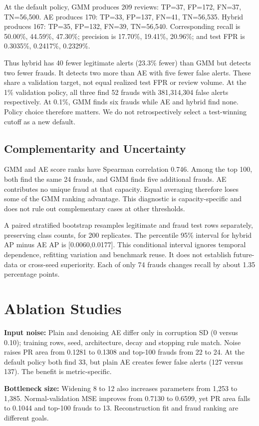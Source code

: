 \documentclass[conference]{IEEEtran}
\begin{document}
At the default policy, GMM produces 209 reviews: TP=37, FP=172, FN=37, TN=56,500. AE produces 170: TP=33, FP=137, FN=41, TN=56,535. Hybrid produces 167: TP=35, FP=132, FN=39, TN=56,540. Corresponding recall is 50.00\%, 44.59\%, 47.30\%; precision is 17.70\%, 19.41\%, 20.96\%; and test FPR is 0.3035\%, 0.2417\%, 0.2329\%.

Thus hybrid has 40 fewer legitimate alerts (23.3\% fewer) than GMM but detects two fewer frauds. It detects two more than AE with five fewer false alerts. These share a validation target, not equal realized test FPR or review volume. At the 1\% validation policy, all three find 52 frauds with 381,314,304 false alerts respectively. At 0.1\%, GMM finds six frauds while AE and hybrid find none. Policy choice therefore matters. We do not retrospectively select a test-winning cutoff as a new default.

\subsection{Complementarity and Uncertainty}
GMM and AE score ranks have Spearman correlation 0.746. Among the top 100, both find the same 24 frauds, and GMM finds five additional frauds. AE contributes no unique fraud at that capacity. Equal averaging therefore loses some of the GMM ranking advantage. This diagnostic is capacity-specific and does not rule out complementary cases at other thresholds.

A paired stratified bootstrap resamples legitimate and fraud test rows separately, preserving class counts, for 200 replicates. The percentile 95\% interval for hybrid AP minus AE AP is [0.0060,0.0177]. This conditional interval ignores temporal dependence, refitting variation and benchmark reuse. It does not establish future-data or cross-seed superiority. Each of only 74 frauds changes recall by about 1.35 percentage points.

\section{Ablation Studies}
\textbf{Input noise:} Plain and denoising AE differ only in corruption SD (0 versus 0.10); training rows, seed, architecture, decay and stopping rule match. Noise raises PR area from 0.1281 to 0.1308 and top-100 frauds from 22 to 24. At the default policy both find 33, but plain AE creates fewer false alerts (127 versus 137). The benefit is metric-specific.

\textbf{Bottleneck size:} Widening 8 to 12 also increases parameters from 1,253 to 1,385. Normal-validation MSE improves from 0.7130 to 0.6599, yet PR area falls to 0.1044 and top-100 frauds to 13. Reconstruction fit and fraud ranking are different goals.
\end{document}
